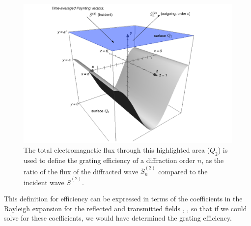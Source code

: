 \begin{figure}[htb] %
   \centering
   \includegraphics[scale=0.6]{../data/Chapter2/2c_poynting/2c.pdf} 
   \caption{The total electromagnetic flux through this highlighted area ($Q_2$) is used to define the grating efficiency of a diffraction order $n$, as the ratio of the flux of the diffracted wave $\bar S_n^{(2)}$ compared to the incident wave $\bar S^{(2)}$.}
   \label{2c}
\end{figure}

This definition for efficiency can be expressed in terms of the coefficients in the Rayleigh expansion for the reflected and transmitted fields , , so that if we could solve for these coefficients, we would have determined the grating efficiency.
